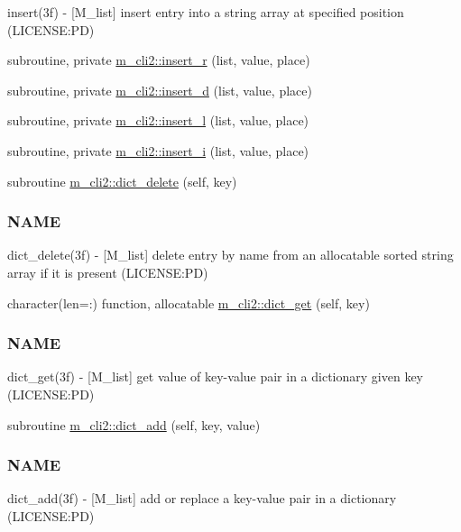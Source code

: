 \begin{DoxyCompactItemize}
\begin{DoxyCompactList}
insert(3f) -\/ \mbox{[}M\+\_\+list\mbox{]} insert entry into a string array at specified position (L\+I\+C\+E\+N\+SE\+:PD) \end{DoxyCompactList}\item 
subroutine, private \mbox{\hyperlink{namespacem__cli2_ae43e655d3678fcc31824a3e9db3daae1}{m\+\_\+cli2\+::insert\+\_\+r}} (list, value, place)
\item 
subroutine, private \mbox{\hyperlink{namespacem__cli2_a737ae8e6f73a3fc8cc260732c047fafb}{m\+\_\+cli2\+::insert\+\_\+d}} (list, value, place)
\item 
subroutine, private \mbox{\hyperlink{namespacem__cli2_a7e5ee66813d8f6db9d48ebdc350a6b3e}{m\+\_\+cli2\+::insert\+\_\+l}} (list, value, place)
\item 
subroutine, private \mbox{\hyperlink{namespacem__cli2_afa6f00a57f1252ba5daa0c440a23ffbb}{m\+\_\+cli2\+::insert\+\_\+i}} (list, value, place)
\item 
subroutine \mbox{\hyperlink{namespacem__cli2_afcdd2c59305faf341ebf8ec3b115a05e}{m\+\_\+cli2\+::dict\+\_\+delete}} (self, key)
\begin{DoxyCompactList}\small\item\em \subsubsection*{N\+A\+ME}

dict\+\_\+delete(3f) -\/ \mbox{[}M\+\_\+list\mbox{]} delete entry by name from an allocatable sorted string array if it is present (L\+I\+C\+E\+N\+SE\+:PD) \end{DoxyCompactList}\item 
character(len=\+:) function, allocatable \mbox{\hyperlink{namespacem__cli2_a5b489c992f1434fa27e7858a483a38c7}{m\+\_\+cli2\+::dict\+\_\+get}} (self, key)
\begin{DoxyCompactList}\small\item\em \subsubsection*{N\+A\+ME}

dict\+\_\+get(3f) -\/ \mbox{[}M\+\_\+list\mbox{]} get value of key-\/value pair in a dictionary given key (L\+I\+C\+E\+N\+SE\+:PD) \end{DoxyCompactList}\item 
subroutine \mbox{\hyperlink{namespacem__cli2_a601a06b7038b524abababc8d437ee823}{m\+\_\+cli2\+::dict\+\_\+add}} (self, key, value)
\begin{DoxyCompactList}\small\item\em \subsubsection*{N\+A\+ME}

dict\+\_\+add(3f) -\/ \mbox{[}M\+\_\+list\mbox{]} add or replace a key-\/value pair in a dictionary (L\+I\+C\+E\+N\+SE\+:PD) \end{DoxyCompactList}\end{DoxyCompactItemize}
